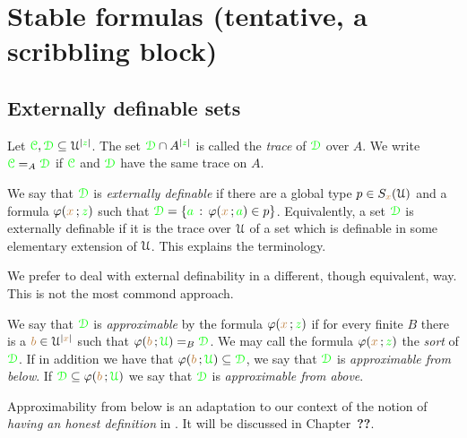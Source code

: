 \documentclass[creche.tex]{subfiles}
\begin{document}
\chapter{Stable formulas (tentative, a scribbling block)}
\label{stability}

\def\mrA{{\mr\Aa}}
\def\grB{{\gr\B}}
\def\grC{{\gr\C}}
\def\grD{{\gr\D}}

\def\medrel#1{\parbox[t]{6ex}{$\displaystyle\hfil #1$}}
\def\ceq#1#2#3{\parbox{25ex}{$\displaystyle #1$}\medrel{#2}$\displaystyle  #3$}

\section{Externally definable sets}
\label{external}


Let $\grC,\grD\subseteq\U^{|{\gr z}|}$. The set $\grD\cap A^{|{\gr z}|}$ is called the \emph{trace\/} of $\grD$ over $A$. We write $\grC=_A\grD$ if  $\grC$ and $\grD$ have the same trace on $A$.

We say that $\grD$ is \emph{externally definable\/} if there are a global type $p\in S_{\color{brown} x}(\EuScript U)$ and a formula $\varphi({\color{brown} x}\,;{\color{green} z})$ such that $\grD=\{{\gr a}\,:\,\phi({\mr x}\,;{\gr a})\in p\}$. Equivalently, a set $\grD$ is externally definable if it is the trace over $\EuScript U$ of a set which is definable in some elementary extension of $\EuScript U$. This explains the terminology.

\noindent\llap{\textcolor{red}{\Large\danger}\kern1.5ex}We prefer to deal with external definability in a different, though equivalent, way. This is not the most commond approach.

\begin{definition}\label{def_epprox}
We say that $\grD$ is \emph{approximable\/} by the formula $\varphi({\color{brown} x}\,;{\color{green} z})$ if for every finite $B$ there is a ${\color{brown} b}\in\EuScript U^{|{\color{brown} x}|}$ such that $\phi({\mr b}\,;{\gr\U})=_B\grD$. We may call the formula $\varphi({\color{brown} x}\,;{\color{green} z})$ the \emph{sort} of $\grD$. If in addition we have that $\phi({\mr b}\,;{\gr\U})\subseteq\grD$, we say that  $\grD$ is \emph{approximable from below}. If  $\grD\subseteq\phi({\mr b}\,;{\gr\U})$ we say that  $\grD$ is \emph{approximable from above}.\QED
\end{definition} 
 
Approximability from below is an adaptation to our context of the notion of \textit{having an honest definition} in \cite{CS}.  It will be discussed in Chapter~\textbf{??}.
\end{document}

